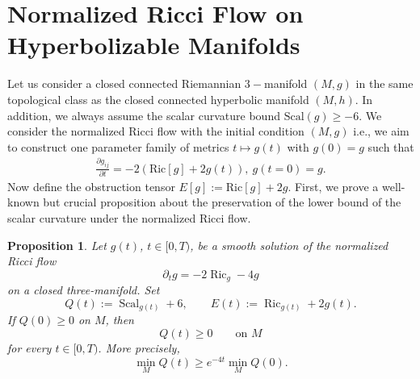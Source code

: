 \documentclass{amsart}
\newtheorem{proposition}{Proposition}[section]
\begin{document}
\section{Normalized Ricci Flow on Hyperbolizable Manifolds} 
\label{ricci}
\noindent Let us consider a closed connected Riemannian $3-$manifold $(M,g)$ in the same topological class as the closed connected hyperbolic manifold $(M,h)$. In addition, we always assume the scalar curvature bound 
$\text{Scal}(g)\geq -6$. We consider the normalized Ricci flow with the initial condition $(M,g)$ i.e., we aim to construct one parameter family of metrics $t\mapsto g(t)$ with $g(0)=g$ such that 
\begin{eqnarray}
\label{eq:flow}
 \frac{\partial g_{ij}}{\partial t}=-2(\text{Ric}[g]+2g(t)),~g(t=0)=g.   
\end{eqnarray}
Now define the obstruction tensor $E[g]:=\text{Ric}[g]+2g$. First, we prove a well-known but crucial proposition about the preservation of the lower bound of the scalar curvature under the normalized Ricci flow. 
\begin{proposition}
\label{scalar1}
Let \(g(t)\), \(t\in[0,T)\), be a smooth solution of the normalized Ricci flow
\[
        \partial_t g=-2\operatorname{Ric}_{g}-4g
\]
on a closed three-manifold.  Set
\[
        Q(t):=\operatorname{Scal}_{g(t)}+6,
        \qquad
        E(t):=\operatorname{Ric}_{g(t)}+2g(t).
\]
If \(Q(0)\geq 0\) on \(M\), then
\[
        Q(t)\geq 0
        \qquad\text{on }M
\]
for every \(t\in[0,T)\).  More precisely,
\[
        \min_M Q(t)\geq e^{-4t}\min_M Q(0).
\]
\end{proposition}
\end{document}
